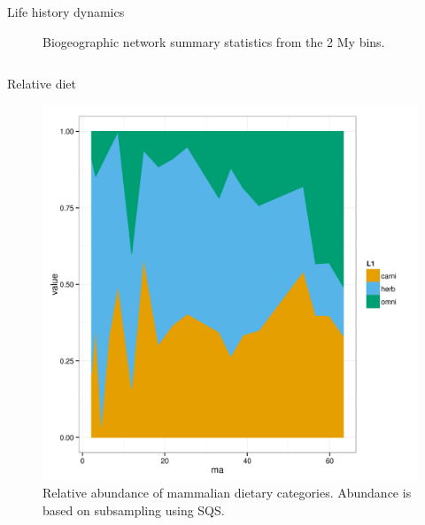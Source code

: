 \documentclass[final]{beamer}\usepackage[]{graphicx}\usepackage[]{color}
\newlength{\onecolwid}
\newlength{\twocolwid}
\begin{document}
\begin{frame}[t]
\begin{columns}[t]
\begin{column}{\twocolwid}
\begin{alertblock}{Life history dynamics}
\begin{figure}[ht]
\begin{center}
\begin{subfigure}[b]{\onecolwid}
              \label{fig:net_loco}
            \end{subfigure}
          \end{center}
          \caption{Biogeographic network summary statistics from the 2 My bins.}
          \label{fig:net_sum}
        \end{figure}
      \end{alertblock}

      \begin{columns}[t,totalwidth = \twocolwid]
        \begin{column}{\onecolwid}
          \begin{block}{Relative diet}
            \begin{figure}[ht]
              \centering
              \includegraphics[height = 0.2\textheight]{figure/sub_bin_diet}
              \caption{Relative abundance of mammalian dietary categories. Abundance is based on subsampling using SQS.}
              \label{fig:rel_ab}
            \end{figure}
          \end{block}
        \end{column}


\end{columns}
\end{column}
\end{columns}
\end{frame}
\end{document}
